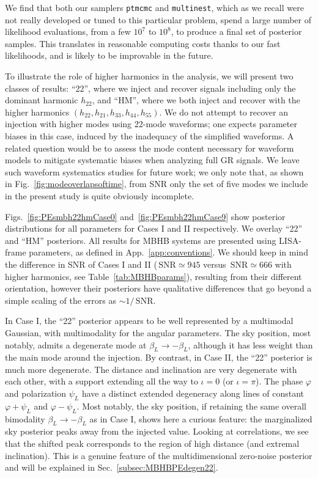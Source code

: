 \documentclass[aps,showpacs,twocolumn,prd,superscriptaddress,nofootinbib]{revtex4-1}
\newcommand{\SNR}{\,\mathrm{SNR}}
\newcommand\betaL{{\beta_{L}}}
\newcommand\psiL{{\psi_{L}}}
\begin{document}
We find that both our samplers \texttt{ptmcmc} and \texttt{multinest}, which as we recall were not really developed or tuned to this particular problem, spend a large number of likelihood evaluations, from a few $10^{7}$ to $10^{8}$, to produce a final set of posterior samples. This translates in reasonable computing costs thanks to our fast likelihoods, and is likely to be improvable in the future.

To illustrate the role of higher harmonics in the analysis, we will present two classes of results: ``22'', where we inject and recover signals including only the dominant harmonic $h_{22}$, and ``HM'', where we both inject and recover with the higher harmonics $(h_{22}, h_{21}, h_{33}, h_{44}, h_{55})$. We do not attempt to recover an injection with higher modes using 22-mode waveforms; one expects parameter biases in this case, induced by the inadequacy of the simplified waveforms. A related question would be to assess the mode content necessary for waveform models to mitigate systematic biases when analyzing full GR signals. We leave such waveform systematics studies for future work; we only note that, as shown in Fig.~\ref{fig:modeoverlapsoftime}, from SNR only the set of five modes we include in the present study is quite obviously incomplete.

Figs.~\ref{fig:PEsmbh22hmCase0} and~\ref{fig:PEsmbh22hmCase9} show posterior distributions for all parameters for Cases I and II respectively. We overlay ``22'' and ``HM'' posteriors. All results for MBHB systems are presented using LISA-frame parameters, as defined in App.~\ref{app:conventions}. We should keep in mind the difference in SNR of Cases I and II ($\SNR \simeq 945$ versus $\SNR \simeq 666$ with higher harmonics, see Table~\ref{tab:MBHBparams}), resulting from their different orientation, however their posteriors have qualitative differences that go beyond a simple scaling of the errors as $\sim 1/\SNR$.

In Case I, the ``22'' posterior appears to be well represented by a multimodal Gaussian, with multimodality for the angular parameters. The sky position, most notably, admits a degenerate mode at $\betaL \rightarrow -\betaL$, although it has less weight than the main mode around the injection. By contrast, in Case II, the ``22'' posterior is much more degenerate. The distance and inclination are very degenerate with each other, with a support extending all the way to $\iota=0$ (or $\iota=\pi$). The phase $\varphi$ and polarization $\psiL$ have a distinct extended degeneracy along lines of constant $\varphi + \psiL$ and $\varphi - \psiL$. Most notably, the sky position, if retaining the same overall bimodality $\betaL \rightarrow -\betaL$ as in Case I, shows here a curious feature: the marginalized sky posterior peaks away from the injected value. Looking at correlations, we see that the shifted peak corresponds to the region of high distance (and extremal inclination). This is a genuine feature of the multidimensional zero-noise posterior and will be explained in Sec.~\ref{subsec:MBHBPEdegen22}.
\end{document}
